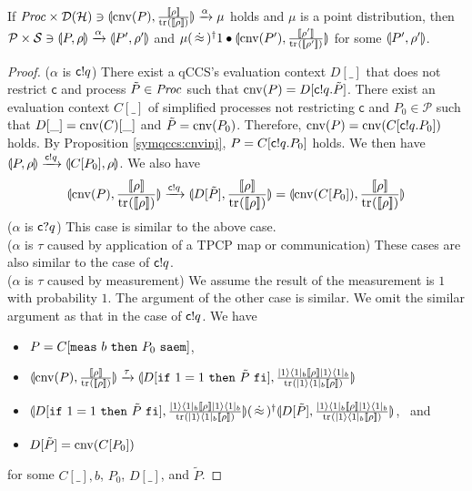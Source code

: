 \begin{lem}
 \label{symqccs:csimscon_point}
 If
 $\mathit{Proc} \times \mathcal{D}(\mathcal{H}) \ni
 \llparenthesis \mathrm{cnv}(P), \frac{[\![\rho]\!]}{{\rm tr}_{}([\![\rho]\!])} \rrparenthesis
 \xrightarrow{\alpha}
 \mu$ holds and $\mu$ is a point distribution, then
 $\mathcal{P} \times \mathcal{S} \ni 
 \llparenthesis P, \rho \rrparenthesis \xrightarrow{\alpha} \llparenthesis P', \rho' \rrparenthesis$ and
 $\mu (\,\dot\approx\,)^\dagger
 1 \bullet \llparenthesis \mathrm{cnv}(P'), \frac{[\![\rho']\!]}{{\rm tr}_{}([\![\rho']\!])} \rrparenthesis$
 for some $\llparenthesis P', \rho' \rrparenthesis$.
\end{lem}
\begin{proof}
 ($\alpha$ is $\mathsf{c}! q$) There exist a qCCS's
evaluation context $D[\_]$
that does not restrict $\mathsf{c}$ and process $\tilde P \in
\mathit{Proc}$ such that
$\mathrm{cnv}(P) = D[\mathsf{c}! q.\tilde P]$. There exist
an evaluation context $C[\_]$ of simplified processes not 
restricting $\mathsf{c}$ and
$P_0 \in \mathcal{P}$ such that 
$D[\_] = \mathrm{cnv}(C)[\_]$ and $\tilde P = \mathrm{cnv}(P_0)$.
Therefore, $\mathrm{cnv}(P) = \mathrm{cnv}(C[\mathsf{c}! q.P_0])$ holds.
By Proposition \ref{symqccs:cnvinj}, $P = C[\mathsf{c}! q.P_0]$ holds.
We then have $\llparenthesis P, \rho \rrparenthesis \xrightarrow{\mathsf{c}! q} 
\llparenthesis C[P_0], \rho \rrparenthesis$.
We also have
\[
 \con{\cnv{P}}{\frac{\braw{\rho}}{\tr{}{\braw{\rho}}}}
 \xrightarrow{\sndq{c}{q}}
 \con{D[\tilde P]}{\frac{\braw{\rho}}{\tr{}{\braw{\rho}}}}
 =
 \con{\cnv{C[P_0]}}{\frac{\braw{\rho}}{\tr{}{\braw{\rho}}}}
\]
 ($\alpha$ is $\mathsf{c}? q$) This case is similar to the above case.\\
 ($\alpha$ is $\tau$ caused by application of a TPCP map or
communication) These cases are
also similar to the case of $\mathsf{c}! q$.\\
($\alpha$ is $\tau$ caused by measurement) We assume 
the result of the measurement is $1$ with probability $1$.
The argument of the other case is similar. We omit the
similar argument as that in the case of $\mathsf{c}! q$.
We have
\begin{itemize}
 \item $P = C[{\tt meas}~b~{\tt then}~P_0~{\tt saem}]$, 
 \item $\con{\cnv{P}}{\frac{\braw{\rho}}{\tr{}{\braw{\rho}}}}
       \xrightarrow{\tau}
       \con{D[\myif{1 = 1}{\tilde P}]}
       {\frac{\ket{1}\bra{1}_b\braw{\rho}\ket{1}\bra{1}_b}
       {\tr{}{\ket{1}\bra{1}_b\braw{\rho}}}}$
 \item $\con{D[\myif{1 = 1}{\tilde P}]}
       {\frac{\ket{1}\bra{1}_b\braw{\rho}\ket{1}\bra{1}_b}
       {\tr{}{\ket{1}\bra{1}_b\braw{\rho}}}}
       (\strg)^\dagger
       \con{D[\tilde P]}
       {\frac{\ket{1}\bra{1}_b\braw{\rho}\ket{1}\bra{1}_b}
       {\tr{}{\ket{1}\bra{1}_b\braw{\rho}}}}$, \mbox{ and}
 \item $D[\tilde P] = \mathrm{cnv}(C[P_0])$
\end{itemize}
for some $C[\_], b$, $P_0$, $D[\_]$, and $\tilde P$.
\end{proof}
